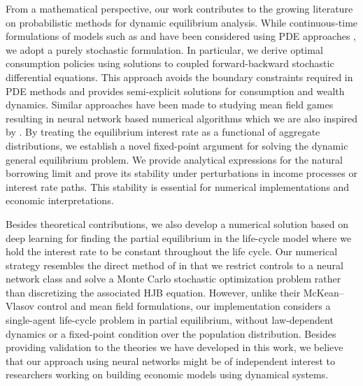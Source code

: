 \documentclass[11pt,oneside,english,reqno,dvipsnames,table]{amsart}
\numberwithin{equation}{section}
\theoremstyle{plain}
\theoremstyle{definition}
\theoremstyle{remark}
\theoremstyle{plain}
\theoremstyle{plain}
\theoremstyle{plain}
\theoremstyle{plain}
\theoremstyle{plain}
\theoremstyle{plain}
\theoremstyle{plain}
\numberwithin{thm}{section}
\begin{document}
From a mathematical perspective, our work contributes to the growing literature on probabilistic methods for dynamic equilibrium analysis. While continuous-time formulations of models such as \cite{aiyagari_94_uninsured} and \cite{huggett_93_risk_free} have been considered using PDE approaches \cite{achdou_han_lasry_lions_moll_21_income,achdou_francisco_lasry_lions_moll_14_pde,ambrose_21_existence}, we adopt a purely stochastic formulation. In particular, we derive optimal consumption policies using solutions to coupled forward-backward stochastic differential equations. This approach avoids the boundary constraints required in PDE methods and provides semi-explicit solutions for consumption and wealth dynamics. Similar approaches have been made to studying mean field games \cite{delarue_02_existence,carmona_delarue_18_book_I,carmona_delarue_18_book_II} resulting in neural network based numerical algorithms which we are also inspired by \cite{carmona_lauriere2021}. 
 By treating the equilibrium interest rate as a functional of aggregate distributions, we establish a novel fixed-point argument for solving the dynamic general equilibrium problem.
We provide analytical expressions for the natural borrowing limit and prove its stability under perturbations in income processes or interest rate paths. This stability is essential for numerical implementations and economic interpretations. 

%

Besides theoretical contributions, we also develop a numerical solution based on deep learning for finding the partial equilibrium in the life-cycle model where we hold the interest rate to be constant throughout the life cycle. Our numerical strategy resembles the direct method of \cite{carmona_lauriere2021} in that we restrict controls to a neural network class and solve a Monte Carlo stochastic optimization problem rather than discretizing the associated HJB equation. However, unlike their McKean--Vlasov control and mean field formulations, our implementation considers a single-agent life-cycle problem in partial equilibrium, without law-dependent dynamics or a fixed-point condition over the population distribution. Besides providing validation to the theories we have developed in this work, we believe that our approach using neural networks might be of independent interest to researchers working on building economic models using dynamical systems.
\end{document}
